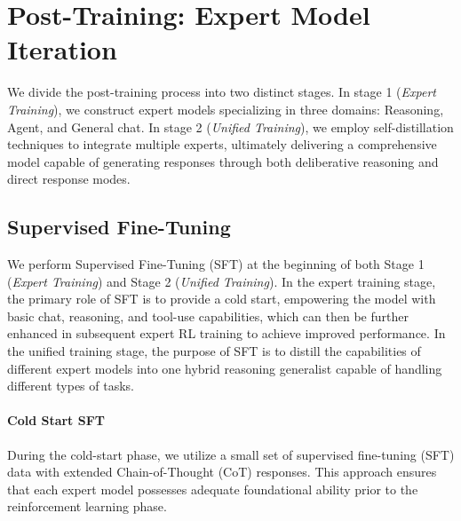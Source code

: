 \section{Post-Training: Expert Model Iteration}

We divide the post-training process into two distinct stages. In stage 1 (\emph{Expert Training}), we construct expert models specializing in three domains: Reasoning, Agent, and General chat. In stage 2 (\emph{Unified Training}), we employ self-distillation techniques to integrate multiple experts, ultimately delivering a comprehensive model capable of generating responses through both deliberative reasoning and direct response modes.

\subsection{Supervised Fine-Tuning}

We perform Supervised Fine-Tuning (SFT) at the beginning of both Stage 1 (\emph{Expert Training}) and Stage 2 (\emph{Unified Training}). In the expert training stage, the primary role of SFT is to provide a cold start, empowering the model with basic chat, reasoning, and tool-use capabilities, which can then be further enhanced in subsequent expert RL training to achieve improved performance. In the unified training stage, the purpose of SFT is to distill the capabilities of different expert models into one hybrid reasoning generalist capable of handling different types of tasks.


\paragraph{Cold Start SFT} During the cold-start phase, we utilize a small set of supervised fine-tuning (SFT) data with extended Chain-of-Thought (CoT) responses. This approach ensures that each expert model possesses adequate foundational ability prior to the reinforcement learning phase.

